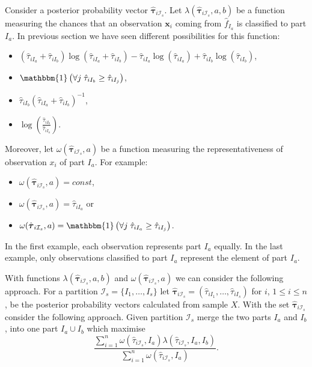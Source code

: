 \documentclass[10pt, a4paper]{article}
\newcommand{\m}[1]{\boldsymbol{#1}}
\begin{document}
Consider a posterior probability vector $\hat{\m \tau}_{i \mathcal{I}_s}$. Let $\lambda(\hat{\m \tau}_{i \mathcal{I}_s}, a, b)$  be a function measuring the chances that an observation $\m x_i$ coming from $\hat{f}_{I_a}$ is classified to part $I_a$. In previous section we have seen different possibilities for this function:
\begin{itemize}
\item $(\hat{\tau}_{iI_a}+\hat{\tau}_{iI_b}) \log(\hat{\tau}_{iI_a} + \hat{\tau}_{iI_b}) - \hat{\tau}_{iI_a} \log(\hat{\tau}_{iI_a}) + \hat{\tau}_{iI_b} \log(\hat{\tau}_{iI_b})$,
\item $\mathbbm{1}\left( \forall j\; \hat{\tau}_{i I_{b}} \geq \hat{\tau}_{iI_j} \right)$, 
\item $\hat{\tau}_{iI_b}(\hat{\tau}_{iI_a} + \hat{\tau}_{iI_b})^{-1}$, 
\item $\log( \frac{ \hat{\tau}_{iI_b} }{ \hat{\tau}_{iI_a} })$.
\end{itemize}
Moreover, let $\omega(\hat{\m \tau}_{i \mathcal{I}_s}, a)$ be a function measuring the representativeness of observation $x_i$ of part $I_a$. For example:
\begin{itemize}
\item $\omega(\hat{\m \tau}_{i \mathcal{I}_s}, a) = const$,
\item $\omega(\hat{\m \tau}_{i \mathcal{I}_s}, a) =  \hat{\tau}_{iI_a}$ or
\item $\omega(\hat{\m \tau}_{i \mathcal{I}_s}, a) = \mathbbm{1}\left( \forall j\; \hat{\tau}_{i I_{a}} \geq \hat{\tau}_{iI_j} \right)$.
\end{itemize}
In the first example, each observation represents part $I_a$ equally. In the last example, only observations classified to part $I_a$ represent the element of part $I_a$.

With functions $\lambda(\hat{\m \tau}_{i \mathcal{I}_s}, a, b)$ and $\omega(\hat{\m \tau}_{i \mathcal{I}_s}, a)$ we can consider the following approach. For a partition $\mathcal{I}_s = \{ I_1, \dots, I_s\}$ let $\hat{\m\tau}_{i \mathcal{I}_s} = \left( \hat{\tau}_{i I_1} , \dots, \hat{\tau}_{i I_s}  \right)$ for $i$, $1 \leq i \leq n$, be the posterior probability vectors calculated from sample $X$. With the set $\hat{\m\tau}_{i \mathcal{I}_s}$ consider the following approach. Given partition $\mathcal{I}_s$ merge the two parts $I_a$ and $I_b$, into one part $I_a \cup I_b$ which maximise
\begin{equation}\label{unifying_equation}
\frac{\sum_{i=1}^n \omega(\hat{\tau}_{i \mathcal{I}_s}, I_a) \lambda(\hat{\tau}_{i \mathcal{I}_s}, I_a, I_b)}{\sum_{i=1}^n \omega(\hat{\tau}_{i \mathcal{I}_s}, I_a) }.
\end{equation}
\end{document}
